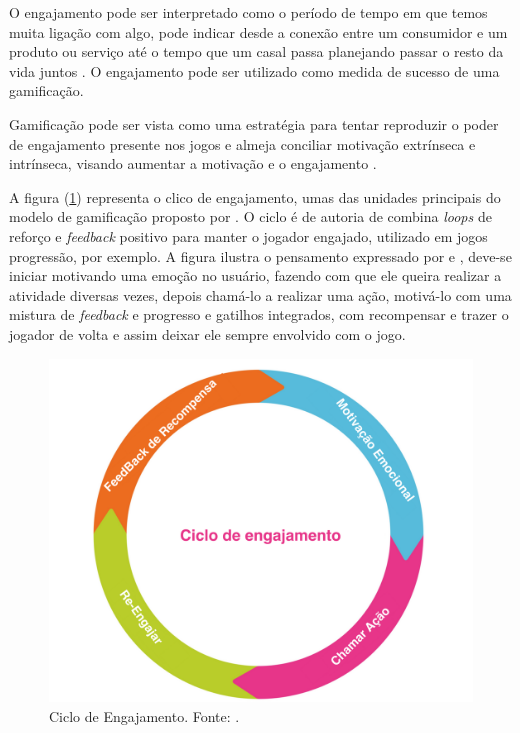 O engajamento pode ser interpretado como o período de tempo em que temos muita ligação com algo, pode indicar desde a conexão entre um consumidor e um produto ou serviço até o tempo que um casal passa planejando passar o resto da vida juntos \cite{zichermann2011gamification}. O engajamento pode ser utilizado como medida de sucesso de uma gamificação. 

Gamificação pode ser vista como uma estratégia para tentar reproduzir o poder de engajamento presente nos jogos \cite{filsecker2014multilevel} e almeja conciliar motivação extrínseca e intrínseca, visando aumentar a motivação e o engajamento \cite{muntean2011raising}. 


A figura (\ref{ciclofig}) representa o clico de engajamento, umas das unidades principais do modelo de gamificação proposto por \cite{kumar2013gamification}. O ciclo é de autoria de \cite{amy} combina \textit{loops} de reforço e \textit{feedback} positivo para manter o jogador engajado, utilizado em jogos progressão, por exemplo. A figura ilustra o pensamento expressado por \cite{amy} e \cite{kumar2013gamification}, deve-se iniciar motivando uma emoção no usuário, fazendo com que ele queira realizar a atividade diversas vezes, depois chamá-lo a realizar uma ação, motivá-lo com uma mistura de \textit{feedback} e progresso e gatilhos integrados, com recompensar e trazer o jogador de volta e assim deixar ele sempre envolvido com o jogo. 

\begin{figure}[h]
	\centering
		\includegraphics[keepaspectratio=true,scale=0.3]{figuras/ciclofig.png}
	\caption{Ciclo de Engajamento. Fonte: \cite{kumar2013gamification}.\label{ciclofig}
}
\end{figure}


